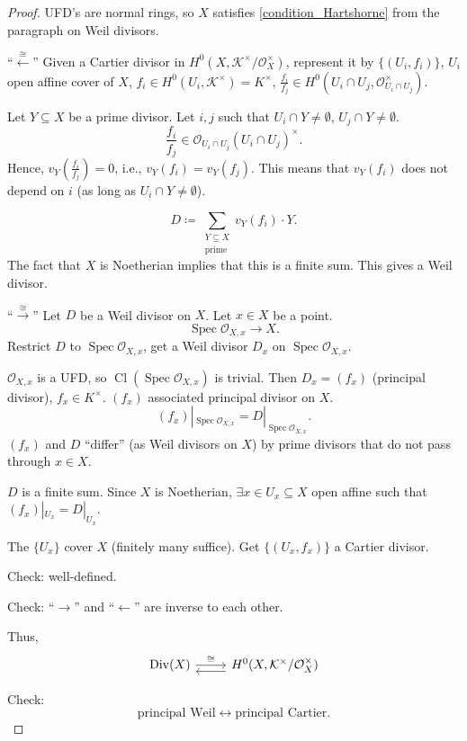 \documentclass[12pt]{article}
\DeclareMathOperator{\Spec}{Spec}
\DeclareMathOperator{\Div}{Div}
\DeclareMathOperator{\Cl}{Cl}
\theoremstyle{definition}
\begin{document}
\begin{proof}
UFD's are normal rings, so $X$ satisfies \eqref{condition_Hartshorne} from the paragraph on Weil divisors.

``$\xleftarrow{\cong}$'' Given a Cartier divisor in $H^0(X,\mathcal{K}^{\times}/\mathcal{O}_X^{\times})$, represent it by $\{(U_i,f_i)\}$, $U_i$ open affine cover of $X$, $f_i\in H^0(U_i,\mathcal{K}^{\times})=K^{\times}$, $\frac{f_i}{f_j}\in H^0(U_i\cap U_j,\mathcal{O}_{U_i\cap U_j}^{\times})$.

Let $Y\subseteq X$ be a prime divisor. Let $i,j$ such that $U_i\cap Y\neq\emptyset$, $U_j\cap Y\neq\emptyset$.
\[\frac{f_i}{f_j}\in\mathcal{O}_{U_i\cap U_j}(U_i\cap U_j)^{\times}.\]
Hence, $v_Y(\frac{f_i}{f_j})=0$, i.e., $v_Y(f_i)=v_Y(f_j)$. This means that $v_Y(f_i)$ does not depend on $i$ (as long as $U_i\cap Y\neq\emptyset$).

\[D\coloneqq\sum_{\substack{Y\subseteq X\\\text{prime}}}v_Y(f_i)\cdot Y.\]
The fact that $X$ is Noetherian implies that this is a finite sum. This gives a Weil divisor.

``$\xrightarrow{\cong}$'' Let $D$ be a Weil divisor on $X$. Let $x\in X$ be a point.
\[\Spec\mathcal{O}_{X,x}\longrightarrow X.\]
Restrict $D$ to $\Spec\mathcal{O}_{X,x}$, get a Weil divisor $D_x$ on $\Spec\mathcal{O}_{X,x}$.

$\mathcal{O}_{X,x}$ is a UFD, so $\Cl(\Spec\mathcal{O}_{X,x})$ is trivial. Then $D_x=(f_x)$ (principal divisor), $f_x\in K^{\times}$. $(f_x)$ associated principal divisor on $X$.
\[(f_x)|_{\Spec\mathcal{O}_{X,x}}=D|_{\Spec\mathcal{O}_{X,x}}.\]
$(f_x)$ and $D$ ``differ'' (as Weil divisors on $X$) by prime divisors that do not pass through $x\in X$.

$D$ is a finite sum. Since $X$ is Noetherian, $\exists x\in U_x\subseteq X$ open affine such that $(f_x)|_{U_x}=D|_{U_x}$.

The $\{U_x\}$ cover $X$ (finitely many suffice). Get $\{(U_x,f_x)\}$ a Cartier divisor.

Check: well-defined.

Check: ``$\rightarrow$'' and ``$\leftarrow$'' are inverse to each other.

Thus,
\[
\begin{tikzcd}
\Div(X)\arrow[r,"\cong"]&H^0(X,\mathcal{K}^{\times}/\mathcal{O}_X^{\times})\arrow[l,shift left, shift left]
\end{tikzcd}
\]

Check:
\[\text{principal Weil}\longleftrightarrow\text{principal Cartier}.\]
\end{proof}
\end{document}
